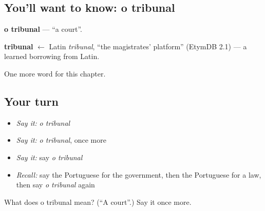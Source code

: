 \subsection*{You'll want to know: o tribunal}
\textbf{o tribunal} — \textquotedblleft{}a court\textquotedblright{}.

\begin{cousinweb}
\textbf{tribunal} $\leftarrow$ Latin \emph{tribunal}, \textquotedblleft{}the magistrates' platform\textquotedblright{} (EtymDB 2.1) — a learned borrowing from Latin.
\end{cousinweb}

\begin{grammarlens}[title={What you've built}]
One more word for this chapter.
\end{grammarlens}

\subsection*{Your turn}
\begin{itemize}
\raggedright
  \item \emph{Say it:} \emph{o tribunal}
  \item \emph{Say it:} \emph{o tribunal}, once more
  \item \emph{Say it:} say \emph{o tribunal}
  \item \emph{Recall:} say the Portuguese for the government, then the Portuguese for a law, then say \emph{o tribunal} again
\end{itemize}

\begin{tcolorbox}[breakable,colback=teal!4,colframe=teal!35!black,title={Before you move on}]
What does o tribunal mean? (\textquotedblleft{}A court\textquotedblright{}.) Say it once more.
\end{tcolorbox}

